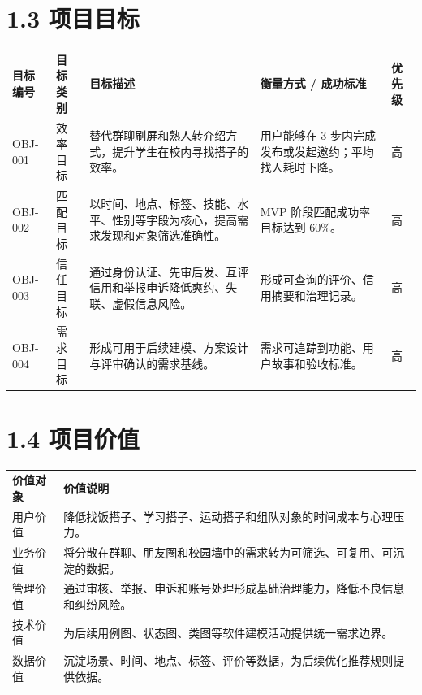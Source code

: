 \section{1.3 项目目标}\label{ux9879ux76eeux76eeux6807}

{\def\LTcaptype{none} %
\begin{xltabular}{\textwidth}{@{}>{\centering\arraybackslash}X>{\centering\arraybackslash}X>{\centering\arraybackslash}X>{\centering\arraybackslash}X>{\centering\arraybackslash}X@{}}
\toprule\noalign{}
\endhead
\bottomrule\noalign{}
\endlastfoot
\textbf{目标编号} & \textbf{目标类别} & \textbf{目标描述} &
\textbf{衡量方式 / 成功标准} & \textbf{优先级} \\
OBJ-001 & 效率目标 &
替代群聊刷屏和熟人转介绍方式，提升学生在校内寻找搭子的效率。 &
用户能够在 3 步内完成发布或发起邀约；平均找人耗时下降。 & 高 \\
OBJ-002 & 匹配目标 &
以时间、地点、标签、技能、水平、性别等字段为核心，提高需求发现和对象筛选准确性。
& MVP 阶段匹配成功率目标达到 60\%。 & 高 \\
OBJ-003 & 信任目标 &
通过身份认证、先审后发、互评信用和举报申诉降低爽约、失联、虚假信息风险。
& 形成可查询的评价、信用摘要和治理记录。 & 高 \\
OBJ-004 & 需求目标 & 形成可用于后续建模、方案设计与评审确认的需求基线。
& 需求可追踪到功能、用户故事和验收标准。 & 高 \\
\end{xltabular}
}

\section{1.4 项目价值}\label{ux9879ux76eeux4ef7ux503c}

{\def\LTcaptype{none} %
\begin{xltabular}{\textwidth}{@{}>{\centering\arraybackslash}X>{\centering\arraybackslash}X@{}}
\toprule\noalign{}
\endhead
\bottomrule\noalign{}
\endlastfoot
\textbf{价值对象} & \textbf{价值说明} \\
用户价值 &
降低找饭搭子、学习搭子、运动搭子和组队对象的时间成本与心理压力。 \\
业务价值 &
将分散在群聊、朋友圈和校园墙中的需求转为可筛选、可复用、可沉淀的数据。 \\
管理价值 &
通过审核、举报、申诉和账号处理形成基础治理能力，降低不良信息和纠纷风险。 \\
技术价值 & 为后续用例图、状态图、类图等软件建模活动提供统一需求边界。 \\
数据价值 &
沉淀场景、时间、地点、标签、评价等数据，为后续优化推荐规则提供依据。 \\
\end{xltabular}
}

